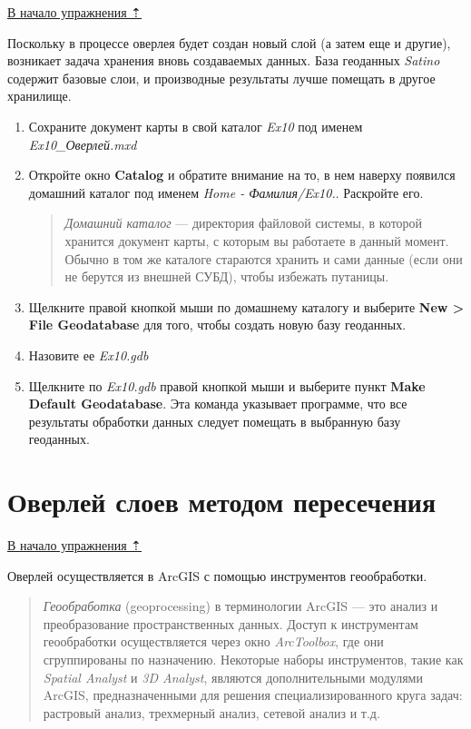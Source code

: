 \documentclass[]{book}
\theoremstyle{definition}
\theoremstyle{definition}
\theoremstyle{definition}
\theoremstyle{remark}
\begin{document}
\protect\hyperlink{overlay}{В начало упражнения ⇡}

Поскольку в процессе оверлея будет создан новый слой (а затем еще и
другие), возникает задача хранения вновь создаваемых данных. База
геоданных \emph{Satino} содержит базовые слои, и производные результаты
лучше помещать в другое хранилище.

\begin{enumerate}
\def\labelenumi{\arabic{enumi}.}
\item
  Сохраните документ карты в свой каталог \emph{Ex10} под именем
  \emph{Ex10\_Оверлей.mxd}
\item
  Откройте окно \textbf{Catalog} и обратите внимание на то, в нем
  наверху появился домашний каталог под именем \emph{Home -
  Фамилия/Ex10.}. Раскройте его.

  \begin{quote}
  \emph{Домашний каталог} --- директория файловой системы, в которой
  хранится документ карты, с которым вы работаете в данный момент.
  Обычно в том же каталоге стараются хранить и сами данные (если они не
  берутся из внешней СУБД), чтобы избежать путаницы.
  \end{quote}
\item
  Щелкните правой кнопкой мыши по домашнему каталогу и выберите
  \textbf{New \textgreater{} File Geodatabase} для того, чтобы создать
  новую базу геоданных.
\item
  Назовите ее \emph{Ex10.gdb}
\item
  Щелкните по \emph{Ex10.gdb} правой кнопкой мыши и выберите пункт
  \textbf{Make Default Geodatabase}. Эта команда указывает программе,
  что все результаты обработки данных следует помещать в выбранную базу
  геоданных.
\end{enumerate}

\hypertarget{overlay-intersect}{%
\section{Оверлей слоев методом пересечения}\label{overlay-intersect}}

\protect\hyperlink{overlay}{В начало упражнения ⇡}

Оверлей осуществляется в ArcGIS с помощью инструментов геообработки.

\begin{quote}
\emph{Геообработка} (geoprocessing) в терминологии ArcGIS --- это анализ
и преобразование пространственных данных. Доступ к инструментам
геообработки осуществляется через окно \emph{ArcToolbox}, где они
сгруппированы по назначению. Некоторые наборы инструментов, такие как
\emph{Spatial Analyst} и \emph{3D Analyst}, являются дополнительными
модулями ArcGIS, предназначенными для решения специализированного круга
задач: растровый анализ, трехмерный анализ, сетевой анализ и т.д.
\end{quote}
\end{document}
